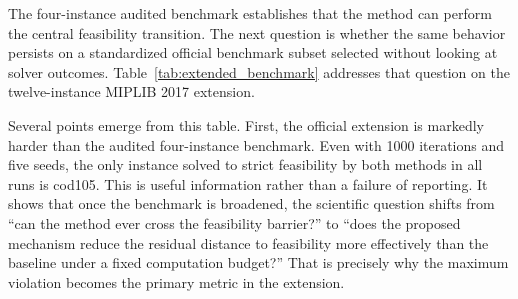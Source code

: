 The four-instance audited benchmark establishes that the method can perform the central feasibility transition. The next question is whether the same behavior persists on a standardized official benchmark subset selected without looking at solver outcomes. Table~\ref{tab:extended_benchmark} addresses that question on the twelve-instance MIPLIB 2017 extension.

\begin{table}[htbp]
\centering
\caption{Official MIPLIB 2017 extension under a fixed budget of 1000 iterations and five random seeds. Reported violations are per-instance means after audited repair and rechecking, so the table measures how effectively each method reduces residual infeasibility when full closure is still difficult.}
\label{tab:extended_benchmark}
\small
{}
\end{table}

Several points emerge from this table. First, the official extension is markedly harder than the audited four-instance benchmark. Even with 1000 iterations and five seeds, the only instance solved to strict feasibility by both methods in all runs is cod105. This is useful information rather than a failure of reporting. It shows that once the benchmark is broadened, the scientific question shifts from ``can the method ever cross the feasibility barrier?'' to ``does the proposed mechanism reduce the residual distance to feasibility more effectively than the baseline under a fixed computation budget?'' That is precisely why the maximum violation becomes the primary metric in the extension.


